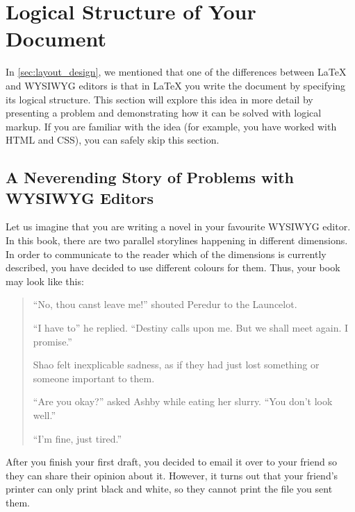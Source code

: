 \section{Logical Structure of Your Document}\label{sec:logical_structure}

In \autoref{sec:layout_design}, we mentioned that one of the
differences between \LaTeX{} and WYSIWYG editors is that in \LaTeX{} you write
the document by specifying its logical structure. This section will explore
this idea in more detail by presenting a problem and demonstrating how it can be
solved with logical markup. If you are familiar with the idea (for example, you
have worked with HTML and CSS), you can safely skip this section.

\subsection{A Neverending Story of Problems with WYSIWYG Editors}

Let us imagine that you are writing a novel in your favourite WYSIWYG editor. In
this book, there are two parallel storylines happening in different dimensions.
In order to communicate to the reader which of the dimensions is currently
described, you have decided to use different colours for them. Thus, your book
may look like this:
\begin{quotation}
  {\color[HTML]{B71C1C}

    \enquote{No, thou canst leave me!} shouted Peredur to the Launcelot.

    \enquote{I have to} he replied. \enquote{Destiny calls upon me. But we shall
      meet again. I promise.} }

  {\color[HTML]{2E7D32}

    Shao felt inexplicable sadness, as if they had just lost something or
    someone important to them.

    \enquote{Are you okay?} asked Ashby while eating her slurry. \enquote{You
      don't look well.}

    \enquote{I'm fine, just tired.}
  }
\end{quotation}

After you finish your first draft, you decided to email it over to your friend
so they can share their opinion about it. However, it turns out that your
friend's printer can only print black and white, so they cannot print the file
you sent them.

